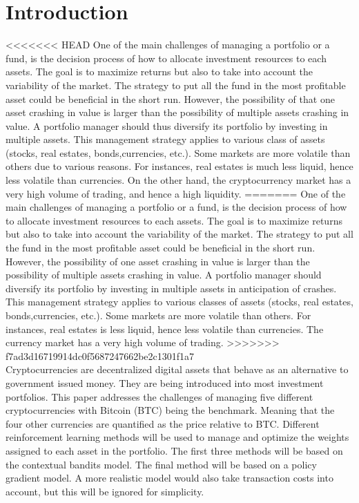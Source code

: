 \documentclass[a4paper,12pt]{article}
\begin{document}
\section{Introduction}
<<<<<<< HEAD
One of the main challenges of managing a portfolio or a fund, is the decision process of how to allocate investment resources to each assets. The goal is to maximize returns but also to take into account the variability of the market. The strategy to put all the fund in the most profitable asset could be beneficial in the short run. However, the possibility of that one asset crashing in value is larger than the possibility of multiple assets crashing in value. A portfolio manager should thus diversify its portfolio by investing in multiple assets. This management strategy applies to various class of assets (stocks, real estates, bonds,currencies, etc.). Some markets are more volatile than others due to various reasons. For instances, real estates is much less liquid, hence less volatile than currencies. On the other hand, the cryptocurrency market has a very high volume of trading, and hence a high liquidity. 
=======
One of the main challenges of managing a portfolio or a fund, is the decision process of how to allocate investment resources to each assets. The goal is to maximize returns but also to take into account the variability of the market. The strategy to put all the fund in the most profitable asset could be beneficial in the short run. However, the possibility of one asset crashing in value is larger than the possibility of multiple assets crashing in value. A portfolio manager should  diversify its portfolio by investing in multiple assets in anticipation of crashes. This management strategy applies to various classes of assets (stocks, real estates, bonds,currencies, etc.). Some markets are more volatile than others. For instances, real estates is less liquid, hence less volatile than currencies. The currency market has a very high volume of trading. 
>>>>>>> f7ad3d16719914dc0f5687247662be2c1301f1a7
 \\

Cryptocurrencies are decentralized digital assets that behave as an alternative to government issued money. They are being introduced into most investment portfolios. This paper addresses the challenges of managing five different cryptocurrencies with Bitcoin (BTC) being the benchmark. Meaning that the four other currencies are quantified as the price relative to BTC.  Different reinforcement learning methods will be used to manage and optimize the weights assigned to each asset in the portfolio. The first three methods will be based on the contextual bandits model. The final method will be based on a policy gradient model. A more realistic model would also take transaction costs into account, but this will be ignored for simplicity. \\
\end{document}
